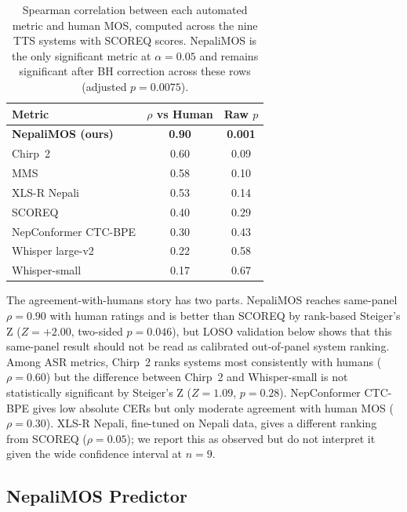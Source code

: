 \documentclass[11pt]{article}
\begin{document}
\begin{table}[h]
\centering
\caption{Spearman correlation between each automated metric and human MOS, computed across the nine TTS systems with SCOREQ scores. NepaliMOS is the only significant metric at $\alpha = 0.05$ and remains significant after BH correction across these rows (adjusted $p=0.0075$).}
\label{tab:metric_vs_human}
\begin{tabular}{lcc}
\toprule
Metric & $\rho$ vs Human & Raw $p$ \\
\midrule
\textbf{NepaliMOS (ours)} & \textbf{0.90} & \textbf{0.001} \\
Chirp~2 & 0.60 & 0.09 \\
MMS & 0.58 & 0.10 \\
XLS-R Nepali & 0.53 & 0.14 \\
SCOREQ & 0.40 & 0.29 \\
NepConformer CTC-BPE & 0.30 & 0.43 \\
Whisper large-v2 & 0.22 & 0.58 \\
Whisper-small & 0.17 & 0.67 \\
\bottomrule
\end{tabular}
\end{table}

The agreement-with-humans story has two parts. NepaliMOS reaches same-panel $\rho = 0.90$ with human ratings and is better than SCOREQ by rank-based Steiger's Z ($Z = +2.00$, two-sided $p = 0.046$), but LOSO validation below shows that this same-panel result should not be read as calibrated out-of-panel system ranking. Among ASR metrics, Chirp~2 ranks systems most consistently with humans ($\rho = 0.60$) but the difference between Chirp~2 and Whisper-small is not statistically significant by Steiger's Z ($Z = 1.09$, $p = 0.28$). NepConformer CTC-BPE gives low absolute CERs but only moderate agreement with human MOS ($\rho = 0.30$). XLS-R Nepali, fine-tuned on Nepali data, gives a different ranking from SCOREQ ($\rho = 0.05$); we report this as observed but do not interpret it given the wide confidence interval at $n = 9$.

\subsection{NepaliMOS Predictor}
\end{document}
